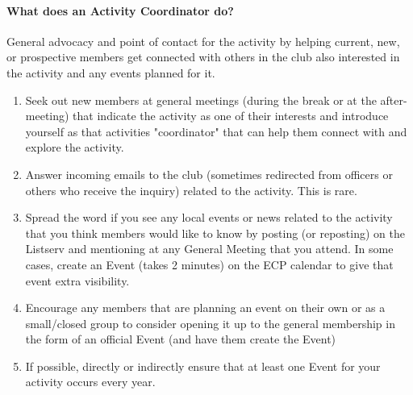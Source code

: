 \documentclass[10pt,a4paper]{article}
\begin{document}
\paragraph{What does an Activity Coordinator do?}
General advocacy and point of contact for the activity by helping current, new, or prospective members
get connected with others in the club also interested in the activity and any events planned for it.
\begin{enumerate}
\item Seek out new members at general meetings (during the break or at the after-meeting) that
indicate the activity as one of their interests and introduce yourself as that activities
"coordinator" that can help them connect with and explore the activity.
\item Answer incoming emails to the club (sometimes redirected from officers or others who receive
the inquiry) related to the activity. This is rare.
\item Spread the word if you see any local events or news related to the activity that you think
members would like to know by posting (or reposting) on the Listserv and mentioning at any
General Meeting that you attend. In some cases, create an Event (takes 2 minutes) on the ECP
calendar to give that event extra visibility.
\item Encourage any members that are planning an event on their own or as a small/closed group to
consider opening it up to the general membership in the form of an official Event (and have
them create the Event)
\item If possible, directly or indirectly ensure that at least one Event for your activity occurs every year.
\end{enumerate}

\end{document}
